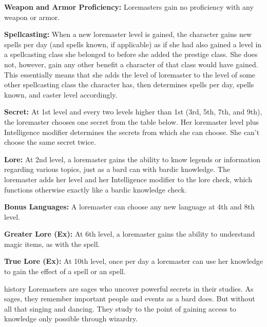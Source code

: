 {
\textbf{Weapon and Armor Proficiency:} Loremasters gain no proficiency with any weapon or armor.

\textbf{Spellcasting:} When a new loremaster level is gained, the character gains new spells per day (and spells known, if applicable) as if she had also gained a level in a spellcasting class she belonged to before she added the prestige class. She does not, however, gain any other benefit a character of that class would have gained. This essentially means that she adds the level of loremaster to the level of some other spellcasting class the character has, then determines spells per day, spells known, and caster level accordingly.

\textbf{Secret:} At 1st level and every two levels higher than 1st (3rd, 5th, 7th, and 9th), the loremaster chooses one secret from the table below. Her loremaster level plus Intelligence modifier determines the secrets from which she can choose. She can't choose the same secret twice.


\textbf{Lore:} At 2nd level, a loremaster gains the ability to know legends or information regarding various topics, just as a bard can with bardic knowledge. The loremaster adds her level and her Intelligence modifier to the lore check, which functions otherwise exactly like a bardic knowledge check.

\textbf{Bonus Languages:} A loremaster can choose any new language at 4th and 8th level.

\textbf{Greater Lore (Ex):} At 6th level, a loremaster gains the ability to understand magic items, as with the  spell.

\textbf{True Lore (Ex):} At 10th level, once per day a loremaster can use her knowledge to gain the effect of a  spell or an  spell.
}
{}
{history}
{Loremasters are sages who uncover powerful secrets in their studies.}
{As sages, they remember important people and events as a bard does. But without all that singing and dancing.}
{They study to the point of gaining access to knowledge only possible through wizardry.}